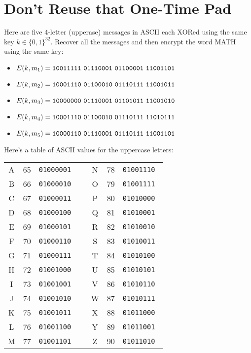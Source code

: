\documentclass[12pt]{article}
\begin{document}
\section{Don't Reuse that One-Time Pad}

Here are five $4$-letter (upperase) messages in ASCII each XORed using the same key $k \in \{0, 1\}^{32}$. Recover all the messages and then encrypt the word MATH using the same key:

\begin{itemize}
\item $E(k, m_1) = \tt{10011111~01110001~01100001~11001101}$
\item $E(k, m_2) = \tt{10001110~01100010~01110111~11001011}$
\item $E(k, m_3) = \tt{10000000~01110001~01101011~11001010}$
\item $E(k, m_4) = \tt{10001110~01100010~01110111~11010111}$
\item $E(k, m_5) = \tt{10000110~01110001~01110111~11001101}$
\end{itemize}


Here's a table of ASCII values for the uppercase letters:

\begin{center}
\begin{tabular}{|c||c|c|c|c||c|c|}
\hline
A & 65 & \tt{01000001} & & N & 78 & \tt{01001110} \\
B & 66 & \tt{01000010} & & O & 79 & \tt{01001111} \\
C & 67 & \tt{01000011} & & P & 80 & \tt{01010000} \\
D & 68 & \tt{01000100} & & Q & 81 & \tt{01010001} \\
E & 69 & \tt{01000101} & & R & 82 & \tt{01010010} \\
F & 70 & \tt{01000110} & & S & 83 & \tt{01010011} \\
G & 71 & \tt{01000111} & & T & 84 & \tt{01010100} \\
H & 72 & \tt{01001000} & & U & 85 & \tt{01010101} \\
I & 73 & \tt{01001001} & & V & 86 & \tt{01010110} \\
J & 74 & \tt{01001010} & & W & 87 & \tt{01010111} \\
K & 75 & \tt{01001011} & & X & 88 & \tt{01011000} \\
L & 76 & \tt{01001100} & & Y & 89 & \tt{01011001} \\
M & 77 & \tt{01001101} & & Z & 90 & \tt{01011010} \\
\hline
\end{tabular}
\end{center}
\end{document}
